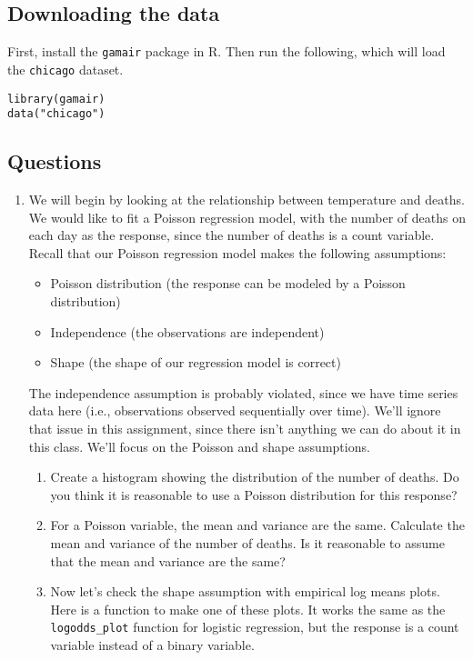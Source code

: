 \documentclass[11pt]{article}
\begin{document}
\subsection*{Downloading the data}

First, install the \verb;gamair; package in R. Then run the following, which will load the \verb;chicago; dataset.
\begin{verbatim}
library(gamair)
data("chicago")
\end{verbatim}

\subsection*{Questions}

\begin{enumerate}
\item We will begin by looking at the relationship between temperature and deaths. We would like to fit a Poisson regression model, with the number of deaths on each day as the response, since the number of deaths is a count variable. Recall that our Poisson regression model makes the following assumptions:

\begin{itemize}
\item Poisson distribution (the response can be modeled by a Poisson distribution)
\item Independence (the observations are independent)
\item Shape (the shape of our regression model is correct)
\end{itemize}

The independence assumption is probably violated, since we have time series data here (i.e., observations observed sequentially over time). We’ll ignore that issue in this assignment, since there isn’t anything we can do about it in this class. We’ll focus on the Poisson and shape assumptions.

\begin{enumerate}
\item Create a histogram showing the distribution of the number of deaths. Do you think it is reasonable to use a Poisson distribution for this response?

\item For a Poisson variable, the mean and variance are the same. Calculate the mean and variance of the number of deaths. Is it reasonable to assume that the mean and variance are the same?

\item Now let's check the shape assumption with empirical log means plots. Here is a function to make one of these plots. It works the same as the \verb;logodds_plot; function for logistic regression, but the response is a count variable instead of a binary variable.


\end{enumerate}
\end{enumerate}
\end{document}
